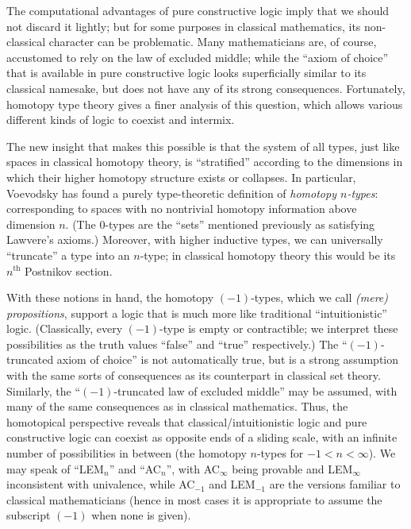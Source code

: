 The computational advantages of pure constructive logic imply that we should not  discard it lightly; but for some purposes in classical mathematics, its non-classical character can be problematic.
Many mathematicians are, of course, accustomed to rely on the law of excluded middle; while the ``axiom of choice'' that is available in pure constructive logic looks superficially similar to its classical namesake, but does not have any of its strong consequences.
Fortunately, homotopy type theory gives a finer analysis of this question, which allows various different kinds of logic to coexist and intermix.

The new insight that makes this possible is that the system of all types, just like spaces in classical homotopy theory, is ``stratified'' according to the dimensions in which their higher homotopy structure exists or collapses.
In particular, Voevodsky has found a purely type-theoretic definition of \emph{homotopy $n$-types}: corresponding to spaces with no nontrivial homotopy information above dimension $n$.
(The $0$-types are the ``sets'' mentioned previously as satisfying Lawvere's axioms.)
Moreover, with higher inductive types, we can universally ``truncate'' a type into an $n$-type; in classical homotopy theory this would be its $n^{\mathrm{th}}$ Postnikov section.

With these notions in hand, the homotopy $(-1)$-types, which we call \emph{(mere) propositions}, support a logic that is much more like traditional ``intuitionistic'' logic.
(Classically, every $(-1)$-type is empty or contractible; we interpret these possibilities as the truth values ``false'' and ``true'' respectively.)
The ``$(-1)$-truncated axiom of choice'' is not automatically true, but is a strong assumption with the same sorts of consequences as its counterpart in classical set theory.
Similarly, the ``$(-1)$-truncated law of excluded middle'' may be assumed, with many of the same consequences as in classical mathematics.
Thus, the homotopical perspective reveals that classical/intuitionistic logic and pure constructive logic can coexist as opposite ends of a sliding scale, with an infinite number of possibilities in between (the homotopy $n$-types for $-1 < n < \infty$).
We may speak of ``LEM$_n$'' and ``AC$_n$'', with AC$_\infty$ being provable and LEM$_\infty$ inconsistent with univalence, while AC$_{-1}$ and LEM$_{-1}$ are the versions familiar to classical mathematicians (hence in most cases it is appropriate to assume the subscript $(-1)$ when none is given).

